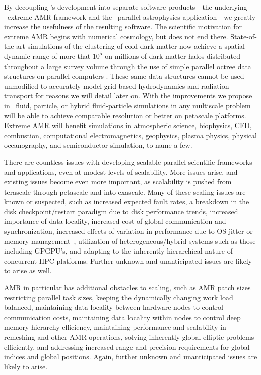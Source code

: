 \documentclass[11pt,letterpaper]{article}
\begin{document}
By decoupling \enzoii's development into separate software
products---the underlying \cello\ extreme AMR framework and the
\enzoii\ parallel astrophysics application---we greatly increase the
usefulness of the resulting software. 
The scientific
motivation for extreme AMR begins with numerical cosmology, but does not
end there. State-of-the-art simulations of the clustering of cold dark matter
now achieve a spatial dynamic range of more that $10^5$ on millions of 
dark matter halos distributed throughout a large survey volume through the use of 
simple parallel octree data structures on parallel computers \cite{Springel05}. 
These same data structures cannot be used unmodified to accurately model 
grid-based hydrodynamics and radiation transport for reasons we will detail later on.
With the improvements we propose in \cello\ fluid, particle, or hybrid
fluid-particle simulations in any multiscale problem will be able to achieve
comparable resolution or better on petascale platforms. Extreme AMR will
benefit simulations in atmospheric science, biophysics, CFD, combustion, 
computational electromagnetics, geophysics, plasma physics, physical oceanography, 
and semiconductor simulation, to name a few.

 There are countless issues
with developing scalable parallel scientific frameworks and
applications, even at modest levels of scalability.  More issues
arise, and existing issues become even more important, as scalability is pushed
from terascale through petascale and into exascale.  Many of these
scaling issues are known or suspected, such as
%
increased expected fault rates,
%
a breakdown in the disk checkpoint/restart paradigm due to disk
performance trends,
%
%
increased importance of data locality,
%
increased cost of global communication and synchronization,
%
%
increased effects of variation in performance due to OS
jitter or memory management~\cite{StSh09},
%
utilization of heterogeneous/hybrid systems such as those including
GPGPU's,
%
and adapting to the inherently hierarchical nature of concurrent HPC
platforms.  Further unknown and unanticipated issues are likely to arise
as well.

AMR in particular has additional
obstacles to scaling, such as
%
AMR patch sizes restricting parallel task sizes,
%
keeping the dynamically changing work load balanced,
%
maintaining data locality between hardware nodes to control
communication costs,
%
maintaining data locality within nodes to control deep memory hierarchy
efficiency,
%
maintaining performance and scalability in remeshing and other AMR
operations,
%
solving inherently global elliptic problems efficiently,
%
and addressing increased range and precision requirements for global
indices and global positions.
%
Again, further unknown and unanticipated issues are likely to arise.
\end{document}

